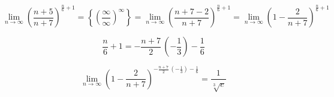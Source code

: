 \documentclass[../rgr1.tex]{subfiles}
\begin{document}
\Solution

\begin{equation}
	\lim_{n\to\infty}\left( \frac{n+5}{n+7} \right)^{\frac{n}{6}+1} =
	\left\{ \left( \frac{\infty}{\infty} \right)^{\infty} \right\} =
	\lim_{n\to\infty}\left( \frac{n+7-2}{n+7} \right)^{\frac{n}{6}+1} =
	\lim_{n\to{\infty}}{\left(1-\dfrac{2}{n+7}\right)^{\frac{n}{6}+1}}
\end{equation}

\begin{equation}
	\dfrac{n}{6}+1=-\dfrac{n+7}{2}\,\left(-\dfrac{1}{3}\right)-\dfrac{1}{6}
\end{equation}

\begin{equation}
	\lim_{n\to{\infty}}{\left(1-\dfrac{2}{n+7}\right)^{-\frac{n+7}{2}\,\left(-\frac{1}{3}\right)-\frac{1}{6}}}
		=
		\dfrac{1}{\sqrt[{3}]{e}}
\end{equation}

\end{document}
